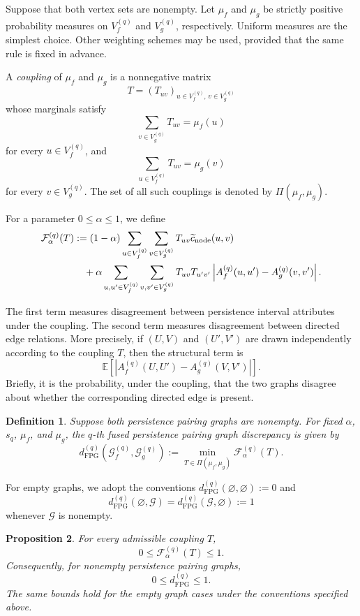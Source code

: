\documentclass[11pt]{article}
\theoremstyle{paperdefinition}
\newtheorem{definition}{Definition}[section]
\theoremstyle{paperplain}
\newtheorem{proposition}[definition]{Proposition}
\theoremstyle{paperremark}
\begin{document}
Suppose that both vertex sets are nonempty. Let $\mu_f$ and $\mu_g$ be strictly positive probability measures on $V_f^{(q)}$ and $V_g^{(q)}$, respectively. Uniform measures are the simplest choice. Other weighting schemes may be used, provided that the same rule is fixed in advance.

A \emph{coupling} of $\mu_f$ and $\mu_g$ is a nonnegative matrix
\[
T = (T_{uv})_{u\in V_f^{(q)}, \,v\in V_g^{(q)}}
\]
whose marginals satisfy
\[
\sum_{v\in V_g^{(q)}}T_{uv} = \mu_f(u)
\]
for every $u\in V_f^{(q)}$, and
\[
\sum_{u\in V_f^{(q)}}T_{uv} = \mu_g(v)
\]
for every $v\in V_g^{(q)}$. The set of all such couplings is denoted by $\Pi(\mu_f,\mu_g)$.

For a parameter $0\leq\alpha\leq1$, we define
\begin{align}
\mathcal F_\alpha^{(q)}(T) &:= (1-\alpha)\sum_{u\in V_f^{(q)}}\sum_{v\in V_g^{(q)}}T_{uv} \widetilde c_{\mathrm{node}}(u,v)\notag\\
&\quad+ \alpha\sum_{u,u'\in V_f^{(q)}}\sum_{v,v'\in V_g^{(q)}}T_{uv}T_{u'v'}\left|A_f^{(q)}(u,u') - A_g^{(q)}(v,v')\right|.
\label{eq:fused-objective}
\end{align}

The first term measures disagreement between persistence interval attributes under the coupling. The second term measures disagreement between directed edge relations. More precisely, if $(U,V)$ and $(U',V')$ are drawn independently according to the coupling $T$, then the structural term is
\[
\mathbb E\left[\left|A_f^{(q)}(U,U') - A_g^{(q)}(V,V')\right|\right].
\]
Briefly, it is the probability, under the coupling, that the two graphs disagree about whether the corresponding directed edge is present.

\begin{definition}
\label{def:fpg-discrepancy}
Suppose both persistence pairing graphs are nonempty. For fixed $\alpha$, $s_q$, $\mu_f$, and $\mu_g$, the \emph{$q$-th fused persistence pairing graph discrepancy} is given by
\[
d_{\mathrm{FPG}}^{(q)}\left(\mathcal G_f^{(q)}, \mathcal G_g^{(q)}\right) := \min_{T\in\Pi(\mu_f,\mu_g)}\mathcal F_\alpha^{(q)}(T).
\]
\end{definition}

For empty graphs, we adopt the conventions $d_{\mathrm{FPG}}^{(q)}(\varnothing,\varnothing) := 0$ and
\[
d_{\mathrm{FPG}}^{(q)}(\varnothing,\mathcal G) = d_{\mathrm{FPG}}^{(q)}(\mathcal G,\varnothing) := 1
\]
whenever $\mathcal G$ is nonempty.

\begin{proposition}
\label{prop:fpg-basic-properties}
\label{lem:fpg-bounded}
For every admissible coupling $T$,
\[
0 \leq \mathcal F_\alpha^{(q)}(T) \leq 1.
\]
Consequently, for nonempty persistence pairing graphs,
\[
0 \leq d_{\mathrm{FPG}}^{(q)} \leq 1.
\]
The same bounds hold for the empty graph cases under the conventions specified above.
\end{proposition}
\end{document}
